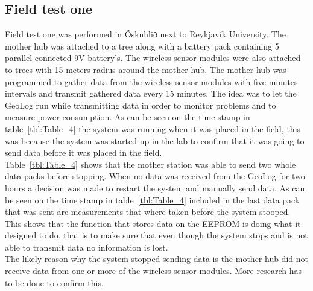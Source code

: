 \subsection{Field test one}
Field test one was performed in Öskuhlið next to Reykjavík University. The mother hub was attached to a tree along with a battery pack containing 5 parallel connected 9V battery's. The wireless sensor modules were also attached to trees with 15 meters radius around the mother hub. The mother hub was programmed to gather data from the wireless sensor modules with five minutes intervals and transmit gathered data every 15 minutes. The idea was to let the GeoLog run while transmitting data in order to monitor problems and to measure power consumption. As can be seen on the time stamp  in table~\ref{tbl:Table_4} the system was running when it was placed in the field, this was because the system was started up in the lab to confirm that it was going to send data before it was placed in the field. \\
Table~\ref{tbl:Table_4} shows that the mother station was able to send two whole data packs before stopping. When no data was received from the GeoLog for two hours a decision was made to restart the system and manually send data. As can be seen on the time stamp in table~\ref{tbl:Table_4} included in the last data pack that was sent are measurements that where taken before the system stooped. This shows that the function that stores data on the EEPROM is doing what it designed to do, that is to make sure that even though the system stops and is not able to transmit data no information is lost. \\
The likely reason why the system stopped sending data is the mother hub did not receive data from one or more of the wireless sensor modules. More research has to be done to confirm this.

